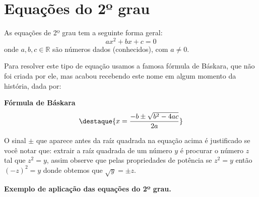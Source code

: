 \section{Equações do 2º grau}

\colorbox{azul}{
 \begin{minipage}{0.9\linewidth}
 \begin{center}
   As equações de 2º grau tem a seguinte forma geral:
   \[ax^2 + bx + c = 0\]
  onde $a, b, c \in \mathbb{R}$ são números dados (conhecidos), com $a \neq 0 $.
 \end{center}
 \end{minipage}}

 \vskip0.3cm

Para resolver este tipo de equação usamos a famosa fórmula de Báskara, que não foi criada por ele, mas acabou recebendo este nome em algum momento da história, dada por:

 \vskip0.3cm
 \begin{center}
 \textbf{Fórmula de Báskara}
   \[\destaque{x= \frac{-b \pm \sqrt{b^2 - 4ac}}{2a}}\]
 \end{center}

O sinal $\pm$ que aparece antes da raíz quadrada na equação acima é justificado se você notar que: extrair a raíz quadrada de um número $y$ é procurar o número $z$ tal que $z^2 = y$, assim observe que pelas propriedades de potência se $z^2= y$ então $(-z)^2= y$ donde obtemos que $\sqrt{y} = \pm z$.

\vskip0.3cm

\textbf {Exemplo de aplicação das equações do 2º grau.}

